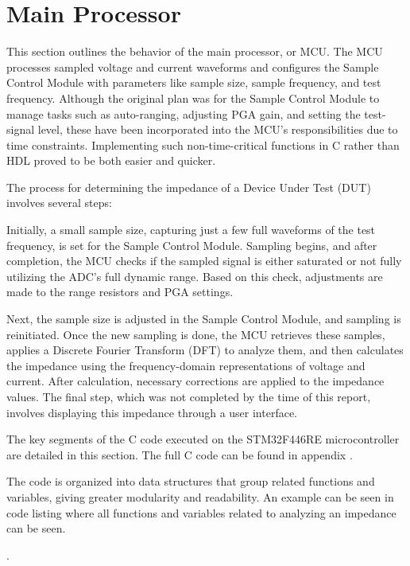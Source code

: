 \section{Main Processor} \label{sec:MCU}

This section outlines the behavior of the main processor, or MCU. The MCU processes sampled voltage and current waveforms and configures the Sample Control Module with parameters like sample size, sample frequency, and test frequency. Although the original plan was for the Sample Control Module to manage tasks such as auto-ranging, adjusting PGA gain, and setting the test-signal level, these have been incorporated into the MCU's responsibilities due to time constraints. Implementing such non-time-critical functions in C rather than HDL proved to be both easier and quicker.

The process for determining the impedance of a Device Under Test (DUT) involves several steps:

Initially, a small sample size, capturing just a few full waveforms of the test frequency, is set for the Sample Control Module. Sampling begins, and after completion, the MCU checks if the sampled signal is either saturated or not fully utilizing the ADC's full dynamic range. Based on this check, adjustments are made to the range resistors and PGA settings. 

Next, the sample size is adjusted in the Sample Control Module, and sampling is reinitiated. Once the new sampling is done, the MCU retrieves these samples, applies a Discrete Fourier Transform (DFT) to analyze them, and then calculates the impedance using the frequency-domain representations of voltage and current. After calculation, necessary corrections are applied to the impedance values. The final step, which was not completed by the time of this report, involves displaying this impedance through a user interface.

The key segments of the C code executed on the STM32F446RE microcontroller are detailed in this section. The full C code can be found in appendix .

The code is organized into data structures that group related functions and variables, giving greater modularity and readability. An example can be seen in code listing  where all functions and variables related to analyzing an impedance can be seen.

. 

